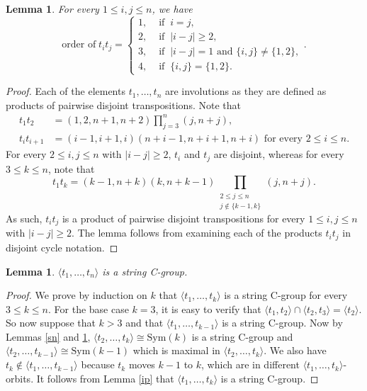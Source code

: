 \documentclass{amsart}
\numberwithin{equation}{section}
\theoremstyle{plain} %
\newtheorem{lemma}[theorem]{Lemma}
\begin{document}
\begin{lemma} \label{csp1}
For every $1 \leq i,j \leq n$, we have
\begin{equation*}
\text{order of} \; t_i t_j = \begin{cases}
1, & \text{ if } \ i=j, \\
2, & \text{ if } \ |i-j| \ge 2, \\
3, & \text{ if } \ |i-j| = 1 \text{ and } \{i,j\} \neq \{1,2\}, \\
4, & \text{ if } \ \{i,j\} = \{1,2\}.
\end{cases}.
\end{equation*}
\end{lemma}

\begin{proof}
Each of the elements $t_1,\dots,t_n$ are involutions as they are defined as products of pairwise disjoint transpositions. Note that
\begin{align*}
t_1 t_2 &=(1,2,n+1,n+2) \prod_{j=3}^n (j,n+j), \\
t_i t_{i+1}&=(i-1,i+1,i)(n+i-1,n+i+1,n+i) \text{ for every } 2 \leq i \leq n.
\end{align*}
For every $2 \leq i,j \leq n$ with $|i-j|\ge2$, $t_i$ and $t_j$ are disjoint, whereas for every $3 \leq k \leq n$, note that 
\begin{equation*}
t_1 t_k = (k-1,n+k)(k,n+k-1) \prod_{\substack{2 \leq j \leq n \\ j \notin \{k-1,k\}}} (j,n+j).
\end{equation*}
As such, $t_i t_j$ is a product of pairwise disjoint transpositions for every $1 \leq i,j \leq n$ with $|i-j|\ge2$. The lemma follows from examining each of the products $t_i t_j$ in disjoint cycle notation.
\end{proof}

\begin{lemma} \label{csp2} 
$\langle t_1,\dots,t_n \rangle$ is a string C-group.
\end{lemma}

\begin{proof}
We prove by induction on $k$ that $\langle t_1,\dots,t_k\rangle$ is a string C-group for every $3 \leq k \leq n$. For the base case $k=3$, it is easy to verify that $\langle t_1,t_2 \rangle \cap \langle t_2,t_3 \rangle = \langle t_2 \rangle$. So now suppose that $k>3$ and that $\langle t_1,\dots,t_{k-1}\rangle$ is a string C-group. Now by Lemmas \ref{sn} and \ref{csp1}, $\langle t_2,\dots,t_k \rangle \cong \mathrm{Sym}(k)$ is a string C-group and $\langle t_2,\dots,t_{k-1}\rangle \cong \mathrm{Sym}(k-1)$ which is maximal in $\langle t_2,\dots,t_k \rangle$. We also have $t_k \notin \langle t_1,\dots,t_{k-1}\rangle$ because $t_k$ moves $k-1$ to $k$, which are in different $\langle t_1,\dots,t_k\rangle$-orbits. It follows from Lemma \ref{ip} that $\langle t_1,\dots,t_k\rangle$ is a string C-group.
\end{proof}
\end{document}

